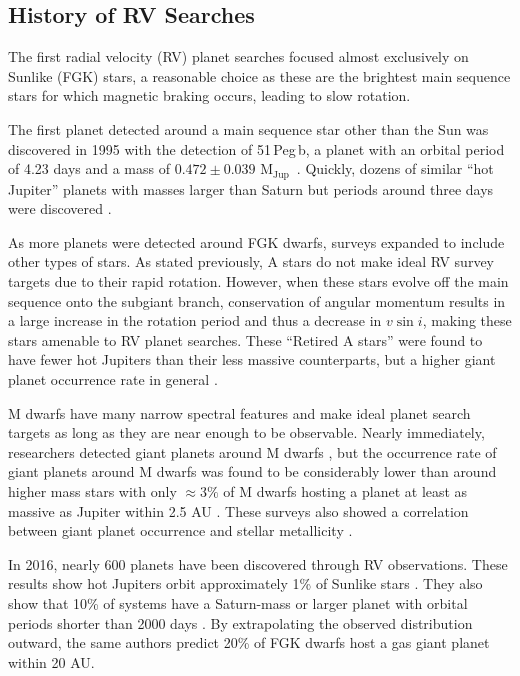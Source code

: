\documentclass[12pt]{caltech_thesis}
\newcommand{\mjup}{{M$_\textrm{Jup}$}}
\begin{document}
\subsection{History of RV Searches}
The first radial velocity (RV) planet searches focused almost exclusively on Sunlike
(FGK) stars, a reasonable choice as these are the brightest main sequence stars for 
which magnetic braking occurs, leading to slow rotation.

The first planet detected around a main sequence star other than the Sun was discovered
in 1995 with the detection of 51\,Peg\,b, a planet with an orbital period of 4.23 days
and a mass of $0.472 \pm 0.039$ \mjup\ \citep{Mayor95}.
Quickly, dozens of similar ``hot Jupiter'' planets with masses larger than Saturn but 
periods around three days were discovered \citep[e.g.][]{Marcy98, Butler97, Wright07}.

As more planets were detected around FGK dwarfs, surveys expanded to include other
types of stars.
As stated previously, A stars do not make ideal RV survey targets due to their rapid
rotation.
However, when these stars evolve off the main sequence onto the subgiant branch,
conservation of angular momentum results in a large increase in the rotation period and
thus a decrease in $v \sin i$, making these stars amenable to RV planet searches.
These ``Retired A stars'' were found to have fewer hot Jupiters than their less massive
counterparts, but a higher giant planet occurrence rate in general \citep{Johnson07b,
Johnson11b, Bowler10}.

M dwarfs have many narrow spectral features and make ideal planet search targets as
long as they are near enough to be observable.
Nearly immediately, researchers detected giant planets around M dwarfs \citep{Butler04, Butler06}, but the occurrence rate of giant planets around M dwarfs was found to be 
considerably lower than around higher mass stars with
only $\approx 3\%$ of M dwarfs hosting a planet at least as massive as Jupiter 
within 2.5 AU \citep{Johnson10a, Bonfils13}.
These surveys also showed a correlation between giant planet occurrence and stellar
metallicity \citep{Fischer05, JohnsonApps09}.



In 2016, nearly 600 planets have been discovered through RV observations.
These results show hot Jupiters orbit approximately 1\% of Sunlike stars \citep{Wright12}.
They also show that 10\% of systems have a Saturn-mass or larger planet with orbital periods
shorter than 2000 days \citep{Cumming08}.
By extrapolating the observed distribution outward, the same authors predict 20\% of FGK dwarfs host a gas giant planet within 20 AU.
\end{document}
